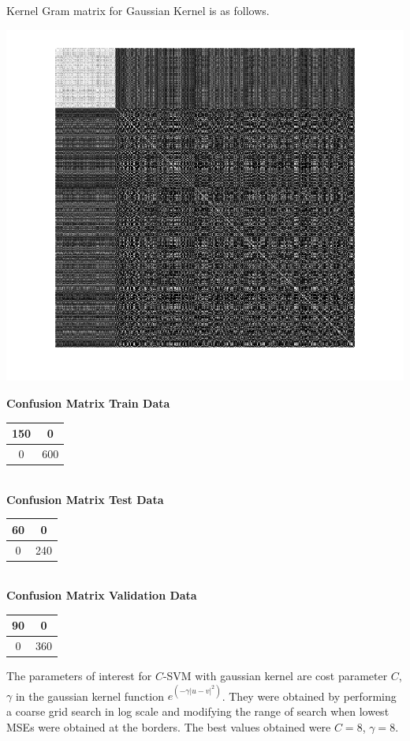 \documentclass{article}
\begin{document}
Kernel Gram matrix for Gaussian Kernel is as follows.
\begin{center}
\includegraphics[scale=1]{Classification/1b/c_g/kgm}
\end{center}

\begin{flushleft}
\textbf{Confusion Matrix Train Data\\[5pt]}
\begin{tabular}{|c|c|}
\hline
150 & 0 \\
\hline
0 & 600\\
\hline
\end{tabular}
\textbf{\\[10pt] Confusion Matrix Test Data \\[5pt]}
\begin{tabular}{|c|c|}
\hline
60 & 0 \\
\hline
0 & 240\\
\hline
\end{tabular}
\textbf{\\[10pt] Confusion Matrix Validation Data \\[5pt]}
\begin{tabular}{|c|c|}
\hline
90 & 0 \\
\hline
0 & 360\\
\hline
\end{tabular}
\end{flushleft}


The parameters of interest for $C$-SVM with gaussian kernel are cost parameter $C$, $\gamma$ in the gaussian kernel function $e^{(-\gamma|u-v|^{2})}$. They were obtained by performing a coarse grid search in log scale and modifying the range of search when lowest MSEs were obtained at the borders.
The best values obtained were $C=8$, $\gamma=8$.
\end{document}
